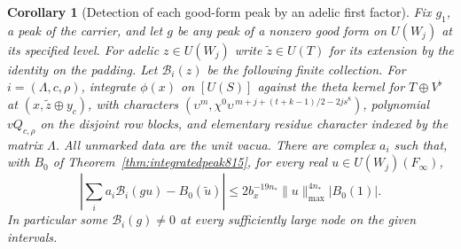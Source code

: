 \documentclass[a4paper,11pt]{article}
\newtheorem{corollary}[proposition]{Corollary}
\theoremstyle{definition}
\theoremstyle{remark}
\numberwithin{equation}{section}
\begin{document}
\begin{corollary}[Detection of each good-form peak by an adelic first factor]
\leavevmode\label{cor:adelicfirst816}
Fix \(g_1\), a peak of the carrier, and let \(g\) be any peak
of a nonzero good form on \(U(W_j)\) at its specified level.
For adelic \(z\in U(W_j)\) write \(\widetilde z\in U(T)\)
for its extension by the identity on the padding.
Let \(\mathcal B_i(z)\) be the following finite collection.
For \(i=(\Lambda,c,\rho)\), integrate \(\phi(x)\) on
\([U(S)]\) against the theta kernel for \(T\oplus V^\flat\)
at \((x,\widetilde z\oplus y_c)\), with characters
\((\upsilon^m,\chi^0\upsilon^{\,m+j+(t+k-1)/2-2js^8})\),
polynomial \(vQ_{c,\rho}\) on the disjoint row blocks,
and elementary residue character indexed by the matrix
\(\Lambda\). All unmarked data are the unit vacua.
There are complex \(a_i\) such that, with \(B_0\) of
Theorem~\ref{thm:integratedpeak815}, for every real
\(u\in U(W_j)(F_\infty)\),
\[
 \left|\sum_i a_i\mathcal B_i(gu)-B_0(\widetilde u)\right|
   \le 2 b_x^{-19n_*}\|u\|_{\max}^{4n_*}|B_0(1)| .
\]
In particular some \(\mathcal B_i(g)\ne0\) at every
sufficiently large node on the given intervals.
\end{corollary}
\end{document}
